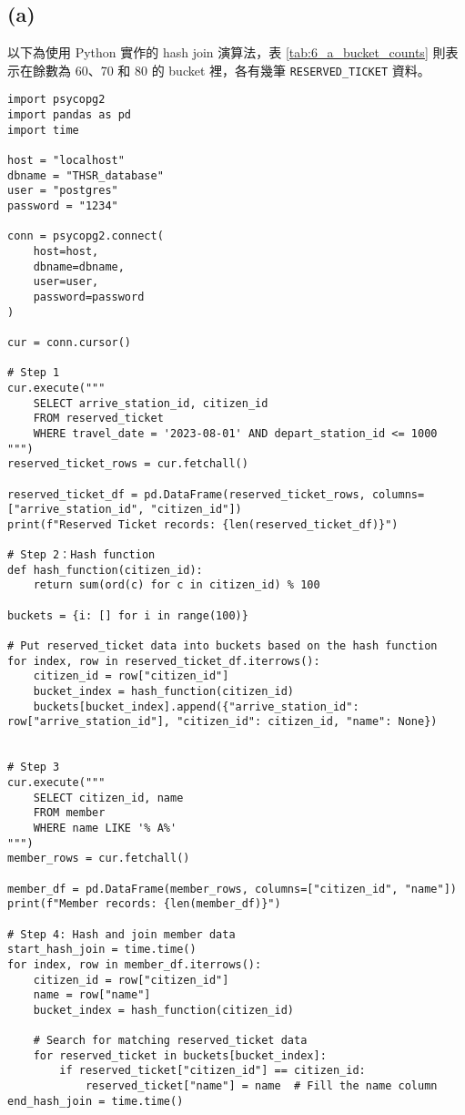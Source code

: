 \documentclass{article}
\begin{document}
\subsection*{(a)}
以下為使用 Python 實作的 hash join 演算法，表 \ref{tab:6_a_bucket_counts} 則表示在餘數為 60、70 和 80 的 bucket 裡，各有幾筆 \texttt{RESERVED\_TICKET} 資料。
\begin{verbatim}
import psycopg2
import pandas as pd
import time

host = "localhost"
dbname = "THSR_database"
user = "postgres"
password = "1234"

conn = psycopg2.connect(
    host=host,
    dbname=dbname,
    user=user,
    password=password
)

cur = conn.cursor()

# Step 1
cur.execute("""
    SELECT arrive_station_id, citizen_id
    FROM reserved_ticket
    WHERE travel_date = '2023-08-01' AND depart_station_id <= 1000
""")
reserved_ticket_rows = cur.fetchall()

reserved_ticket_df = pd.DataFrame(reserved_ticket_rows, columns=["arrive_station_id", "citizen_id"])
print(f"Reserved Ticket records: {len(reserved_ticket_df)}")

# Step 2：Hash function
def hash_function(citizen_id):
    return sum(ord(c) for c in citizen_id) % 100

buckets = {i: [] for i in range(100)}

# Put reserved_ticket data into buckets based on the hash function
for index, row in reserved_ticket_df.iterrows():
    citizen_id = row["citizen_id"]
    bucket_index = hash_function(citizen_id)
    buckets[bucket_index].append({"arrive_station_id": row["arrive_station_id"], "citizen_id": citizen_id, "name": None})


# Step 3
cur.execute("""
    SELECT citizen_id, name
    FROM member
    WHERE name LIKE '% A%'
""")
member_rows = cur.fetchall()

member_df = pd.DataFrame(member_rows, columns=["citizen_id", "name"])
print(f"Member records: {len(member_df)}")

# Step 4: Hash and join member data
start_hash_join = time.time()
for index, row in member_df.iterrows():
    citizen_id = row["citizen_id"]
    name = row["name"]
    bucket_index = hash_function(citizen_id)

    # Search for matching reserved_ticket data
    for reserved_ticket in buckets[bucket_index]:
        if reserved_ticket["citizen_id"] == citizen_id:
            reserved_ticket["name"] = name  # Fill the name column
end_hash_join = time.time()


\end{verbatim}
\end{document}
